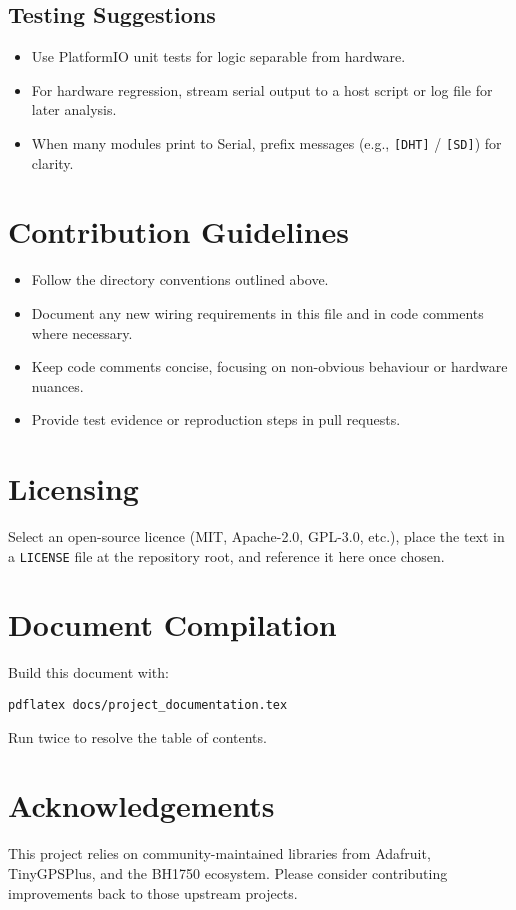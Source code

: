 \documentclass[11pt,a4paper]{article}
\begin{document}
\subsection{Testing Suggestions}

\begin{itemize}
  \item Use PlatformIO unit tests for logic separable from hardware.
  \item For hardware regression, stream serial output to a host script or log file for later analysis.
  \item When many modules print to Serial, prefix messages (e.g., \texttt{[DHT]} / \texttt{[SD]}) for clarity.
\end{itemize}

\section{Contribution Guidelines}

\begin{itemize}
  \item Follow the directory conventions outlined above.
  \item Document any new wiring requirements in this file and in code comments where necessary.
  \item Keep code comments concise, focusing on non-obvious behaviour or hardware nuances.
  \item Provide test evidence or reproduction steps in pull requests.
\end{itemize}

\section{Licensing}

Select an open-source licence (MIT, Apache-2.0, GPL-3.0, etc.), place the text in a \texttt{LICENSE} file at the repository root, and reference it here once chosen.

\section{Document Compilation}

Build this document with:
\begin{verbatim}
pdflatex docs/project_documentation.tex
\end{verbatim}
Run twice to resolve the table of contents.

\section{Acknowledgements}

This project relies on community-maintained libraries from Adafruit, TinyGPSPlus, and the BH1750 ecosystem. Please consider contributing improvements back to those upstream projects.
\end{document}
